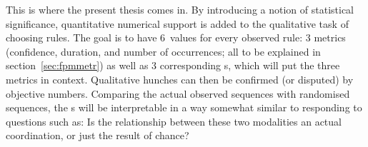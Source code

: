 This is where the present thesis comes in.
By introducing a notion of statistical significance, quantitative numerical support is added to the qualitative task of choosing rules.
The goal is to have 6~values for every observed rule:
3 metrics (confidence, duration, and number of occurrences; all to be explained in section~\ref{sec:fpmmetr}) as well as 3 corresponding \pv s, which will put the three metrics in context.
Qualitative hunches can then be confirmed (or disputed) by objective numbers.
Comparing the actual observed sequences with randomised sequences, the \pv s will be interpretable in a way somewhat similar to responding to questions such as:
Is the relationship between these two modalities an actual coordination, or just the result of chance?























